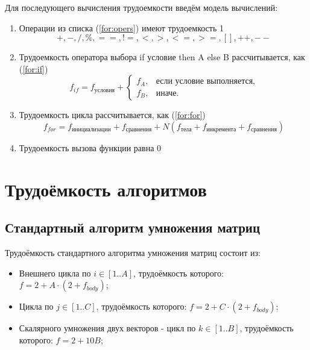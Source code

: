 Для последующего вычисления трудоемкости введём модель вычислений:

\begin{enumerate}
    \item Операции из списка (\ref{for:opers}) имеют трудоемкость 1
    \begin{equation}
        \label{for:opers}
        +, -, /, \%, ==, !=, <, >, <=, >=, [], ++, {-}-
    \end{equation}
    \item Трудоемкость оператора выбора if условие then A else B рассчитывается, как (\ref{for:if})
    \begin{equation}
        \label{for:if}
        f_{if} = f_{\text{условия}} +
        \begin{cases}
            f_A, & \text{если условие выполняется,}\\
            f_B, & \text{иначе.}
        \end{cases}
    \end{equation}
    \item Трудоемкость цикла рассчитывается, как (\ref{for:for})
    \begin{equation}
        \label{for:for}
        f_{for} = f_{\text{инициализации}} + f_{\text{сравнения}} + N(f_{\text{тела}} + f_{\text{инкремента}} + f_{\text{сравнения}})
    \end{equation}
    \item Трудоемкость вызова функции равна 0
\end{enumerate}

\section{Трудоёмкость алгоритмов}

\subsection{Стандартный алгоритм умножения матриц}

Трудоёмкость стандартного алгоритма умножения матриц состоит из:
\begin{itemize}
    \item Внешнего цикла по $i \in [1..A]$, трудоёмкость которого: $f = 2 + A \cdot (2 + f_{body})$;
    \item Цикла по $j \in [1..C]$, трудоёмкость которого: $f = 2 + C \cdot (2 + f_{body})$;
    \item Скалярного умножения двух векторов - цикл по $k \in [1..B]$, трудоёмкость которого: $f = 2 + 10B$;
\end{itemize}

